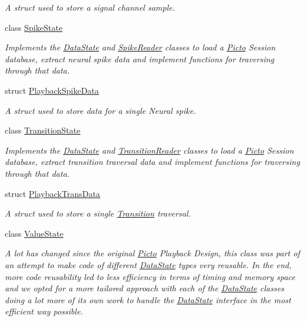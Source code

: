 \begin{DoxyCompactItemize}
\begin{DoxyCompactList}\small\item\em A struct used to store a signal channel sample. \end{DoxyCompactList}\item 
class \hyperlink{class_picto_1_1_spike_state}{Spike\-State}
\begin{DoxyCompactList}\small\item\em Implements the \hyperlink{class_picto_1_1_data_state}{Data\-State} and \hyperlink{class_picto_1_1_spike_reader}{Spike\-Reader} classes to load a \hyperlink{namespace_picto}{Picto} Session database, extract neural spike data and implement functions for traversing through that data. \end{DoxyCompactList}\item 
struct \hyperlink{struct_picto_1_1_playback_spike_data}{Playback\-Spike\-Data}
\begin{DoxyCompactList}\small\item\em A struct used to store data for a single Neural spike. \end{DoxyCompactList}\item 
class \hyperlink{class_picto_1_1_transition_state}{Transition\-State}
\begin{DoxyCompactList}\small\item\em Implements the \hyperlink{class_picto_1_1_data_state}{Data\-State} and \hyperlink{class_picto_1_1_transition_reader}{Transition\-Reader} classes to load a \hyperlink{namespace_picto}{Picto} Session database, extract transition traversal data and implement functions for traversing through that data. \end{DoxyCompactList}\item 
struct \hyperlink{struct_picto_1_1_playback_trans_data}{Playback\-Trans\-Data}
\begin{DoxyCompactList}\small\item\em A struct used to store a single \hyperlink{class_picto_1_1_transition}{Transition} traversal. \end{DoxyCompactList}\item 
class \hyperlink{class_picto_1_1_value_state}{Value\-State}
\begin{DoxyCompactList}\small\item\em A lot has changed since the original \hyperlink{namespace_picto}{Picto} Playback Design, this class was part of an attempt to make code of different \hyperlink{class_picto_1_1_data_state}{Data\-State} types very reusable. In the end, more code reusability led to less efficiency in terms of timing and memory space and we opted for a more tailored approach with each of the \hyperlink{class_picto_1_1_data_state}{Data\-State} classes doing a lot more of its own work to handle the \hyperlink{class_picto_1_1_data_state}{Data\-State} interface in the most efficient way possible. \end{DoxyCompactList}\item 

\end{DoxyCompactItemize}
